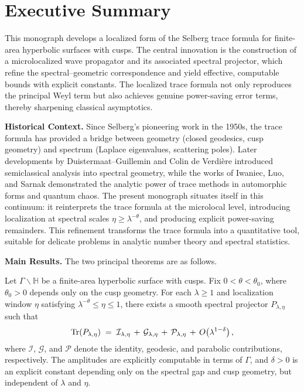 \section{Executive Summary}

This monograph develops a localized form of the Selberg trace formula for
finite-area hyperbolic surfaces with cusps. The central innovation is the
construction of a microlocalized wave propagator and its associated spectral
projector, which refine the spectral–geometric correspondence and yield
effective, computable bounds with explicit constants. The localized trace
formula not only reproduces the principal Weyl term but also achieves genuine
power-saving error terms, thereby sharpening classical asymptotics.

\medskip
\noindent\textbf{Historical Context.}
Since Selberg's pioneering work in the 1950s, the trace formula has provided a
bridge between geometry (closed geodesics, cusp geometry) and spectrum
(Laplace eigenvalues, scattering poles). Later developments by
Duistermaat–Guillemin \cite{DG1975} and Colin de Verdière \cite{CdV1980}
introduced semiclassical analysis into spectral geometry, while the works of
Iwaniec, Luo, and Sarnak \cite{IwaniecSarnak1995, LuoSarnak1995} demonstrated
the analytic power of trace methods in automorphic forms and quantum chaos.
The present monograph situates itself in this continuum: it reinterprets the
trace formula at the microlocal level, introducing localization at spectral
scales $\eta \geq \lambda^{-\theta}$, and producing explicit power-saving
remainders. This refinement transforms the trace formula into a quantitative
tool, suitable for delicate problems in analytic number theory and spectral
statistics.

\medskip
\noindent\textbf{Main Results.} The two principal theorems are as follows.

\begin{theorem}\label{thm:localized-trace}
Let $\Gamma \backslash \mathbb{H}$ be a finite-area hyperbolic surface with
cusps. Fix $0<\theta<\theta_0$, where $\theta_0>0$ depends only on the cusp
geometry. For each $\lambda \geq 1$ and localization window $\eta$ satisfying
$\lambda^{-\theta}\leq \eta \leq 1$, there exists a smooth spectral projector
$P_{\lambda,\eta}$ such that
\[
  \operatorname{Tr}(P_{\lambda,\eta})
  \;=\;
  \mathcal{I}_{\lambda,\eta} \,+\,
  \mathcal{G}_{\lambda,\eta} \,+\,
  \mathcal{P}_{\lambda,\eta}
  \,+\, O\!\left(\lambda^{1-\delta}\right),
\]
where $\mathcal{I}$, $\mathcal{G}$, and $\mathcal{P}$ denote the identity,
geodesic, and parabolic contributions, respectively. The amplitudes are
explicitly computable in terms of $\Gamma$, and $\delta>0$ is an explicit
constant depending only on the spectral gap and cusp geometry, but independent
of $\lambda$ and $\eta$.
\end{theorem}

